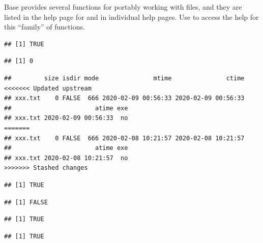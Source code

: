 \documentclass[krantz2]{krantz}\usepackage{knitr}
\begin{document}
Base \Rlang provides several functions for portably working with files, and they are listed in the help page for  and in individual help pages. Use  to access the help for this ``family'' of functions.

\begin{knitrout}\footnotesize
{}\color{fgcolor}\begin{kframe}
\begin{alltt}
 \hlstd{(}\hlopt{!}\hlstd{(}\hlstd{)) \{}
  \hlstd{(}\hlstd{)}
\hlstd{\}}
\end{alltt}
\begin{verbatim}
## [1] TRUE
\end{verbatim}
\begin{alltt}
\hlstd{(}\hlstd{)}
\end{alltt}
\begin{verbatim}
## [1] 0
\end{verbatim}
\begin{alltt}
\hlstd{(}\hlstd{)}
\end{alltt}
\begin{verbatim}
##         size isdir mode               mtime               ctime
<<<<<<< Updated upstream
## xxx.txt    0 FALSE  666 2020-02-09 00:56:33 2020-02-09 00:56:33
##                       atime exe
## xxx.txt 2020-02-09 00:56:33  no
=======
## xxx.txt    0 FALSE  666 2020-02-08 10:21:57 2020-02-08 10:21:57
##                       atime exe
## xxx.txt 2020-02-08 10:21:57  no
>>>>>>> Stashed changes
\end{verbatim}
\begin{alltt}
\hlstd{(}\hlstd{,} \hlstd{)}
\end{alltt}
\begin{verbatim}
## [1] TRUE
\end{verbatim}
\begin{alltt}
\hlstd{(}\hlstd{)}
\end{alltt}
\begin{verbatim}
## [1] FALSE
\end{verbatim}
\begin{alltt}
\hlstd{(}\hlstd{)}
\end{alltt}
\begin{verbatim}
## [1] TRUE
\end{verbatim}
\begin{alltt}
\hlstd{(}\hlstd{)}
\end{alltt}
\begin{verbatim}
## [1] TRUE
\end{verbatim}
\end{kframe}
\end{knitrout}
\end{document}
